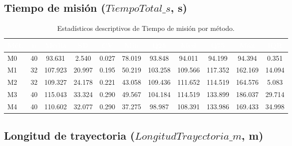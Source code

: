 \documentclass[12pt,a4paper,oneside]{book}
\begin{document}
\subsection{Tiempo de misión ($\textit{TiempoTotal\_s}$, s)}

\begin{table}[H]
\centering
\caption{Estadísticos descriptivos de Tiempo de misión por método.}
\renewcommand{\arraystretch}{1.25}
\small
\begin{tabular}{lcccccccccc}
\toprule
\rowcolor{primary}
\textcolor{white}{\textbf{Mét.}} & \textcolor{white}{\textbf{n}} & \textcolor{white}{\textbf{Media}} & \textcolor{white}{\textbf{SD}} & \textcolor{white}{\textbf{CV}} & \textcolor{white}{\textbf{Mín}} & \textcolor{white}{\textbf{Q25}} & \textcolor{white}{\textbf{Med}} & \textcolor{white}{\textbf{Q75}} & \textcolor{white}{\textbf{Máx}} & \textcolor{white}{\textbf{IQR}} \\
\midrule
M0 & 40 & 93.631 & 2.540 & 0.027 & 78.019 & 93.848 & 94.011 & 94.199 & 94.394 & 0.351 \\
M1 & 32 & 107.923 & 20.997 & 0.195 & 50.219 & 103.258 & 109.566 & 117.352 & 162.169 & 14.094 \\
M2 & 32 & 109.327 & 24.178 & 0.221 & 43.058 & 109.436 & 111.652 & 114.519 & 164.576 & 5.083 \\
M3 & 40 & 115.043 & 33.324 & 0.290 & 49.567 & 104.184 & 114.519 & 133.899 & 186.037 & 29.714 \\
M4 & 40 & 110.602 & 32.077 & 0.290 & 37.275 & 98.987 & 108.391 & 133.986 & 169.433 & 34.998 \\
\bottomrule
\end{tabular}
\end{table}

\subsection{Longitud de trayectoria ($\textit{LongitudTrayectoria\_m}$, m)}
\end{document}
